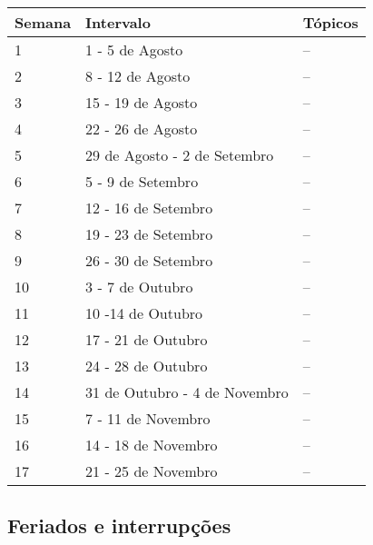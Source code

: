 \begin{table}[H]
	\centering
	\begin{tabular}{lll}%
	\toprule
	\textbf{Semana} & \textbf{Intervalo} & \textbf{Tópicos} \\ 
	\midrule
	1	&	1 - 5 de Agosto	&	--\\
	2	&	8 - 12 de Agosto	&	--\\%
    3 	&	15 - 19 de Agosto	&	--\\%
    4	&	22 - 26 de Agosto	&	--\\%
    5	&	29 de Agosto - 2 de Setembro	&	--\\%
    6	&	5 - 9 de Setembro	& 	--\\%
    7	&	12 - 16 de Setembro	&	--\\%
    8	&	19 - 23 de Setembro	&	--\\%
    9	&	26 - 30 de Setembro &	--\\%
    10	&	3 - 7 de Outubro	& 	--\\%
    11	&	10 -14 de Outubro	&	--\\%
    12	&	17 - 21 de Outubro	& 	--\\%
    13	&	24 - 28 de Outubro 	&	--\\%
    14	&	31 de Outubro - 4 de Novembro	&	--\\%
    15	&	7 - 11 de Novembro	& 	--\\%
    16  &	14 - 18 de Novembro	&	--\\
    17	&	21 - 25 de Novembro	&	--\\
 	 \bottomrule
 	 \end{tabular}
 	 \centering
\end{table}

\subsection*{Feriados e interrupções}

